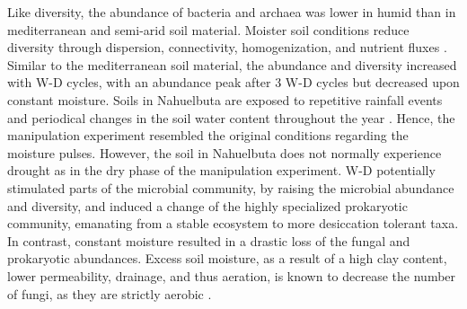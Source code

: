 Like diversity, the abundance of bacteria and archaea was lower in humid than in mediterranean and semi-arid soil material. 
Moister soil conditions reduce diversity through dispersion, connectivity, homogenization, and nutrient fluxes \citep{StovicekA2017}. 
Similar to the mediterranean soil material, the abundance and diversity increased with W-D cycles, with an abundance peak after 3 W-D cycles but decreased upon constant moisture. 
Soils in Nahuelbuta are exposed to repetitive rainfall events and periodical changes in the soil water content throughout the year \citep{Uebernickel2020}. 
Hence, the manipulation experiment resembled the original conditions regarding the moisture pulses. 
However, the soil in Nahuelbuta does not normally experience drought as in the dry phase of the manipulation experiment. 
W-D potentially stimulated parts of the microbial community, by raising the microbial abundance and diversity, and induced a change of the highly specialized prokaryotic community, emanating from a stable ecosystem \citep{Rodriguez2022} to more desiccation tolerant taxa. 
In contrast, constant moisture resulted in a drastic loss of the fungal and prokaryotic abundances. 
Excess soil moisture, as a result of a high clay content, lower permeability, drainage, and thus aeration, is known to decrease the number of fungi, as they are strictly aerobic \citep{Chotte2005}.

